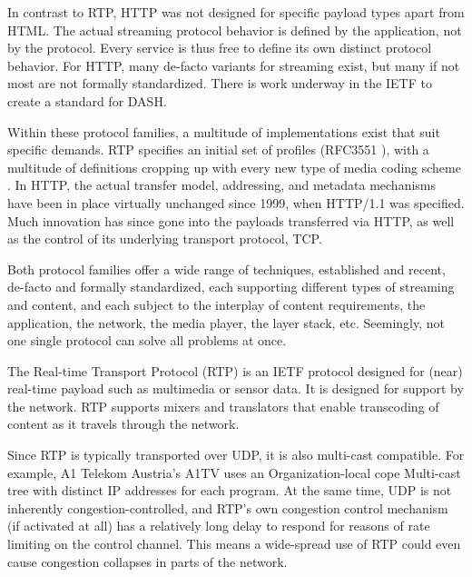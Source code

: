 In contrast to \gls{RTP}, \gls{HTTP} was not designed for specific payload types apart from \gls{HTML}. The actual streaming protocol behavior is defined by the application, not by the protocol. Every service is thus free to define its own distinct protocol behavior. For \gls{HTTP}, many de-facto variants for streaming exist, but many if not most are not formally standardized. There is work underway in the \gls{IETF} to create a standard for \gls{DASH}.



Within these protocol families, a multitude of implementations exist that suit specific demands. \gls{RTP} specifies an initial set of profiles (RFC3551 \cite{rfc3551}), with a multitude of definitions cropping up with every new type of media coding scheme . In HTTP, the actual transfer model, addressing, and metadata mechanisms have been in place virtually unchanged since 1999, when HTTP/1.1 was specified. Much innovation has since gone into the payloads transferred via HTTP, as well as the control of its underlying transport protocol, TCP.

Both protocol families offer a wide range of techniques, established and recent, de-facto and formally standardized, each supporting different types of streaming and content, and each subject to the interplay of content requirements, the application, the network, the media player, the layer stack, etc. Seemingly, not one single protocol can solve all problems at once. 

The Real-time Transport Protocol (RTP) \cite{rfc3550} is an IETF protocol designed for (near) real-time payload such as multimedia or sensor data. It is designed for support by the network. \gls{RTP} supports mixers and translators that enable transcoding of content as it travels through the network.

Since RTP is typically transported over UDP, it is also multi-cast compatible. For example, A1 Telekom Austria’s A1TV uses an Organization-local cope Multi-cast \cite{rfc2365} tree with distinct IP addresses for each program. At the same time, \gls{UDP} is not inherently congestion-controlled, and \gls{RTP}'s own congestion control mechanism (if activated at all) has a relatively long delay to respond for reasons of rate limiting on the control channel. This means a wide-spread use of \gls{RTP} could even cause congestion collapses in parts of the network.



